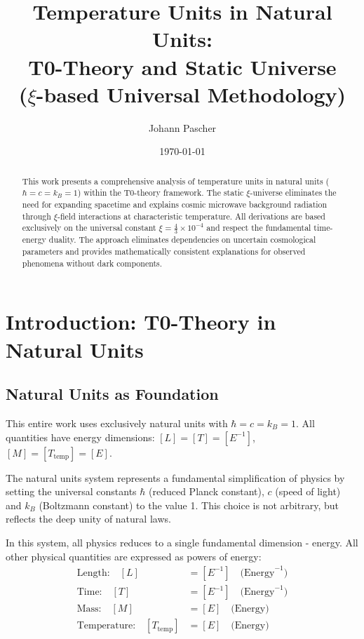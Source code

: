 \documentclass[12pt,a4paper]{article}
\begin{document}
	
	\title{Temperature Units in Natural Units: \\
		T0-Theory and Static Universe \\
		($\xi$-based Universal Methodology)}
	\author{Johann Pascher}
	\date{\today}
	
	\maketitle
	
	\begin{abstract}
		This work presents a comprehensive analysis of temperature units in natural units ($\hbar = c = k_B = 1$) within the T0-theory framework. The static $\xi$-universe eliminates the need for expanding spacetime and explains cosmic microwave background radiation through $\xi$-field interactions at characteristic temperature. All derivations are based exclusively on the universal constant $\xi = \frac{4}{3} \times 10^{-4}$ and respect the fundamental time-energy duality. The approach eliminates dependencies on uncertain cosmological parameters and provides mathematically consistent explanations for observed phenomena without dark components.
	\end{abstract}
	
	\tableofcontents
	\newpage
	
	\section{Introduction: T0-Theory in Natural Units}
	
	\subsection{Natural Units as Foundation}
	
	\begin{important}
		This entire work uses exclusively natural units with $\hbar = c = k_B = 1$. All quantities have energy dimensions: $[L] = [T] = [E^{-1}]$, $[M] = [T_{\text{temp}}] = [E]$.
	\end{important}
	
	The natural units system represents a fundamental simplification of physics by setting the universal constants $\hbar$ (reduced Planck constant), $c$ (speed of light) and $k_B$ (Boltzmann constant) to the value 1. This choice is not arbitrary, but reflects the deep unity of natural laws.
	
	In this system, all physics reduces to a single fundamental dimension - energy. All other physical quantities are expressed as powers of energy:
	\begin{align}
		\text{Length:} \quad [L] &= [E^{-1}] \quad \text{(Energy}^{-1}\text{)} \\
		\text{Time:} \quad [T] &= [E^{-1}] \quad \text{(Energy}^{-1}\text{)} \\
		\text{Mass:} \quad [M] &= [E] \quad \text{(Energy)} \\
		\text{Temperature:} \quad [T_{\text{temp}}] &= [E] \quad \text{(Energy)}
	\end{align}
	
\end{document}
